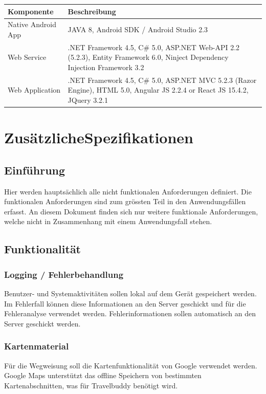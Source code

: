 \documentclass[a4paper,10pt,xetex]{article}
\begin{document}
\begin{longtabu} to \textwidth { | l | X[l] | }
\hline
\textbf{Komponente} & \textbf{Beschreibung} \\\hline
\endhead

Native Android App & JAVA 8, Android SDK / Android Studio 2.3\\\hline
Web Service & .NET Framework 4.5, C\# 5.0, ASP.NET Web-API 2.2 (5.2.3), Entity Framework 6.0, Ninject Dependency Injection Framework 3.2\\\hline
Web Application & .NET Framework 4.5, C\# 5.0, ASP.NET MVC 5.2.3 (Razor Engine), HTML 5.0, Angular JS 2.2.4 or React JS 15.4.2, JQuery 3.2.1\\\hline
\end{longtabu}


\section{ZusätzlicheSpezifikationen}\label{zusuxe4tzliche-spezifikationen}
\subsection{Einführung}\label{einfuxfchrung}
Hier werden hauptsächlich alle nicht funktionalen Anforderungen
definiert. Die funktionalen Anforderungen sind zum grössten Teil in den
Anwendungsfällen erfasst. An diesem Dokument finden sich nur weitere
funktionale Anforderungen, welche nicht in Zusammenhang mit einem
Anwendungsfall stehen.


\subsection{Funktionalität}\label{funktionalituxe4t}
\subsubsection{Logging / Fehlerbehandlung}\label{logging-fehlerbehandlung}
Benutzer- und Systemaktivitäten sollen lokal auf dem Gerät gespeichert
werden. Im Fehlerfall können diese Informationen an den Server geschickt
und für die Fehleranalyse verwendet werden. Fehlerinformationen sollen
automatisch an den Server geschickt werden.


\subsubsection{Kartenmaterial}\label{kartenmaterial}
Für die Wegweisung soll die Kartenfunktionalität von Google verwendet
werden. Google Maps unterstützt das offline Speichern von bestimmten
Kartenabschnitten, was für Travelbuddy benötigt wird.
\end{document}
